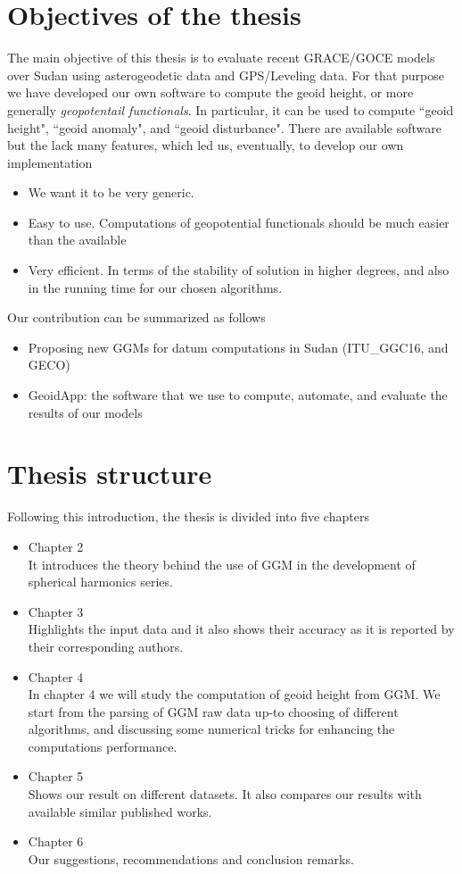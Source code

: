 \section{Objectives of the thesis}
The main objective of this thesis is to evaluate recent GRACE/GOCE models over Sudan using asterogeodetic data and GPS/Leveling data. For that purpose we have developed our own software to compute the geoid height, or more generally \textit{geopotentail functionals}. In particular, it can be used to compute ``geoid height", ``geoid anomaly", and ``geoid disturbance". There are available software but the lack many features, which led us, eventually, to develop our own implementation

\begin{itemize}
	\item We want it to be very generic.
	\item Easy to use. Computations of geopotential functionals should be much easier than the available
	\item Very efficient. In terms of the stability of solution in higher degrees, and also in the running time for our chosen algorithms.
\end{itemize}

Our contribution can be summarized as follows 
\begin{itemize}
	\item Proposing new GGMs for datum computations in Sudan (ITU\_GGC16, and GECO)
	\item GeoidApp: the software that we use to compute, automate, and evaluate the results of our models
\end{itemize}


\section{Thesis structure}
Following this introduction, the thesis is divided into five chapters

\begin{itemize}
	\item Chapter 2\\
	It introduces the theory behind the use of GGM in the development of spherical harmonics series.
	\item Chapter 3\\
	Highlights the input data and it also shows their accuracy as it is reported by their corresponding authors.
	\item Chapter 4\\
	In chapter 4 we will study the computation of geoid height from GGM. We start from the parsing of GGM raw data up-to choosing of different algorithms, and discussing some numerical tricks for enhancing the computations performance.
	\item Chapter 5\\
	Shows our result on different datasets. It also compares our results with available similar published works.
	\item Chapter 6\\
	Our suggestions, recommendations and conclusion remarks.
\end{itemize}
